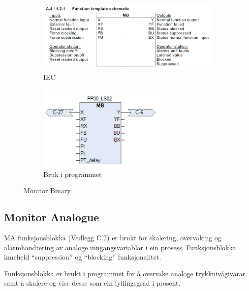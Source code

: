 \begin{figure}[htbp]
    \centering
    \begin{subfigure}[b]{0.45\textwidth}
        \centering
        \includegraphics[width=1\textwidth]{Bilder/MBBlokkIEC.png}
        \caption{IEC}\label{fig:Monitor Binary blokk IEC}
    \end{subfigure}
    \hfill
    \begin{subfigure}[b]{0.45\textwidth}
        \centering
        \includegraphics[width=0.7\textwidth]{Bilder/MBBlokkIProgrammet.png}
        \caption{Bruk i programmet}\label{fig:Monitor Binary blokk i programmet}
    \end{subfigure}
    \caption{Monitor Binary}\label{fig:Monitor Binary}
\end{figure}

\subsection{Monitor Analogue}
\gls{MA} funksjonsblokka (Vedlegg C.2) er brukt for skalering, overvaking og alarmhandtering av \newline
analoge inngangsvariablar i ein prosess.
Funksjonsblokka inneheld ``suppression'' og ``blocking'' funksjonalitet.

Funksjonsblokka er brukt i programmet for å overvake analoge trykknivågivarar samt å skalere og vise desse som ein fyllingsgrad i prosent.

